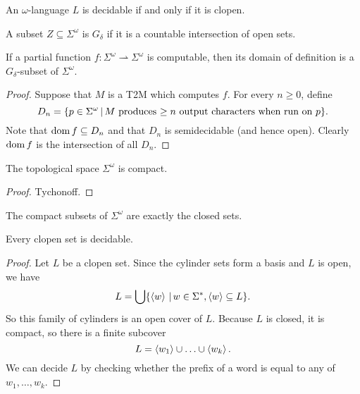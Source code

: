 \begin{theorem}
  An $\omega$-language $L$ is decidable if and only if it is clopen.
\end{theorem}

\begin{definition}
  A subset $Z \subseteq \Sigma^\omega$ is $G_\delta$ if it is a countable
  intersection of open sets.
\end{definition}

\begin{theorem}
  If a partial function $f: \Sigma^\omega \rightharpoonup \Sigma^\omega$ is
  computable, then its domain of definition is a $G_\delta$-subset of
  $\Sigma^\omega$.
\end{theorem}

\begin{proof}
  Suppose that $M$ is a T2M which computes $f$.
  For every $n \ge 0$, define
  \[
	D_n = \{ p \in \Sigma^\omega \,|\, \text{$M$ produces $\ge n$ output
	  characters when run on $p$} \}.
  \]
  Note that $\operatorname{dom} f \subseteq D_n$ and that $D_n$ is semidecidable (and hence
  open).
  Clearly $\operatorname{dom} f$ is the intersection of all $D_n$.
\end{proof}

\begin{theorem}
  The topological space $\Sigma^\omega$ is compact.
\end{theorem}

\begin{proof}
  Tychonoff.
\end{proof}

\begin{corollary}
  The compact subsets of $\Sigma^\omega$ are exactly the closed sets.
\end{corollary}

\begin{lemma}
  Every clopen set is decidable.
\end{lemma}

\begin{proof}
  Let $L$ be a clopen set.
  Since the cylinder sets form a basis and $L$ is open, we have
  \[
	L = \bigcup \{ \left< w \right> \,|\, w \in \Sigma^*, \left< w \right> \subseteq L \}.
  \]
  So this family of cylinders is an open cover of $L$.
  Because $L$ is closed, it is compact, so there is a finite subcover
  \[
	L = \left< w_1 \right> \cup \ldots \cup \left< w_k \right>.
  \]
  We can decide $L$ by checking whether the prefix of a word is equal to any of
  $w_1, \ldots, w_k$.
\end{proof}

